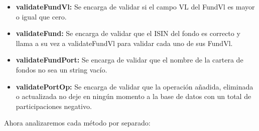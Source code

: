 \documentclass[12pt, a4paper]{book}
\begin{document}
\begin{itemize}
	\item \textbf{validateFundVl:} Se encarga de validar si el campo \gls{VL} del FundVl es mayor o igual que cero.
	\item \textbf{validateFund:} Se encarga de validar que el \gls{ISIN} del fondo es correcto y llama a su vez a validateFundVl para validar cada uno de sus FundVl.
	\item \textbf{validateFundPort:} Se encarga de validar que el nombre de la cartera de fondos no sea un string vacío.
	\item \textbf{validatePortOp:} Se encarga de validar que la operación añadida, eliminada o actualizada no deje en ningún momento a la base de datos con un total de participaciones negativo.
\end{itemize}

Ahora analizaremos cada método por separado:
\end{document}

